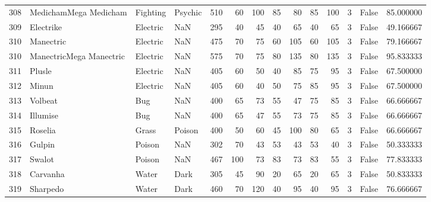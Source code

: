 \begin{tabular}{rlllrrrrrrrrlr}
 308 &      MedichamMega Medicham &  Fighting &   Psychic &    510 &   60 &     100 &       85 &       80 &       85 &    100 &           3 &      False &   85.000000 \\
 309 &                  Electrike &  Electric &       NaN &    295 &   40 &      45 &       40 &       65 &       40 &     65 &           3 &      False &   49.166667 \\
 310 &                  Manectric &  Electric &       NaN &    475 &   70 &      75 &       60 &      105 &       60 &    105 &           3 &      False &   79.166667 \\
 310 &    ManectricMega Manectric &  Electric &       NaN &    575 &   70 &      75 &       80 &      135 &       80 &    135 &           3 &      False &   95.833333 \\
 311 &                     Plusle &  Electric &       NaN &    405 &   60 &      50 &       40 &       85 &       75 &     95 &           3 &      False &   67.500000 \\
 312 &                      Minun &  Electric &       NaN &    405 &   60 &      40 &       50 &       75 &       85 &     95 &           3 &      False &   67.500000 \\
 313 &                    Volbeat &       Bug &       NaN &    400 &   65 &      73 &       55 &       47 &       75 &     85 &           3 &      False &   66.666667 \\
 314 &                   Illumise &       Bug &       NaN &    400 &   65 &      47 &       55 &       73 &       75 &     85 &           3 &      False &   66.666667 \\
 315 &                    Roselia &     Grass &    Poison &    400 &   50 &      60 &       45 &      100 &       80 &     65 &           3 &      False &   66.666667 \\
 316 &                     Gulpin &    Poison &       NaN &    302 &   70 &      43 &       53 &       43 &       53 &     40 &           3 &      False &   50.333333 \\
 317 &                     Swalot &    Poison &       NaN &    467 &  100 &      73 &       83 &       73 &       83 &     55 &           3 &      False &   77.833333 \\
 318 &                   Carvanha &     Water &      Dark &    305 &   45 &      90 &       20 &       65 &       20 &     65 &           3 &      False &   50.833333 \\
 319 &                   Sharpedo &     Water &      Dark &    460 &   70 &     120 &       40 &       95 &       40 &     95 &           3 &      False &   76.666667 \\

\end{tabular}
